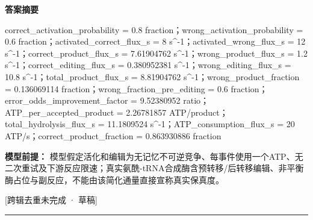 \documentclass[UTF8,11pt,a4paper]{ctexart}
\begin{document}
\noindent\textbf{答案摘要}\par
correct\_activation\_probability = 0.8 fraction；wrong\_activation\_probability = 0.6 fraction；activated\_correct\_flux\_s = 8 s\textasciicircum{}-1；activated\_wrong\_flux\_s = 12 s\textasciicircum{}-1；correct\_product\_flux\_s = 7.61904762 s\textasciicircum{}-1；wrong\_product\_flux\_s = 1.2 s\textasciicircum{}-1；correct\_editing\_flux\_s = 0.380952381 s\textasciicircum{}-1；wrong\_editing\_flux\_s = 10.8 s\textasciicircum{}-1；total\_product\_flux\_s = 8.81904762 s\textasciicircum{}-1；wrong\_product\_fraction = 0.136069114 fraction；wrong\_fraction\_pre\_editing = 0.6 fraction；error\_odds\_improvement\_factor = 9.52380952 ratio；ATP\_per\_accepted\_product = 2.26781857 ATP/product；total\_hydrolysis\_flux\_s = 11.1809524 s\textasciicircum{}-1；ATP\_consumption\_flux\_s = 20 ATP/s；correct\_product\_fraction = 0.863930886 fraction\par
\noindent\textbf{模型前提：}
模型假定活化和编辑为无记忆不可逆竞争、每事件使用一个ATP、无二次重试及下游反应限速；真实氨酰-tRNA合成酶含预转移/后转移编辑、非平衡酶占位与副反应，不能由该简化通量直接宣称真实保真度。\par
\noindent\textcolor{red!65!black}{[跨辑去重未完成 · 草稿]} \par
\medskip\hrule\medskip
{}
\end{document}
